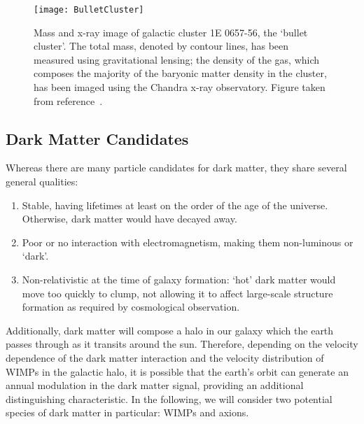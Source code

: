 			\begin{figure}
				\centering
				\texttt{[image: BulletCluster]}
				\caption[Mass and x-ray image of the `bullet cluster', galactic cluster 1E 0657-56.]{Mass and x-ray image of 
				galactic cluster 1E 0657-56, 
				the `bullet cluster'.   The total mass, denoted by contour lines, has been measured using gravitational lensing; 
				the density of the gas, which composes the majority of the baryonic matter density in the cluster, has been 
				imaged using the Chandra x-ray observatory.  %
				Figure taken from reference~\cite{Clowe06}.}
				\label{fig:DMBulletCluster}
			\end{figure}	
	
		\subsection{Dark Matter Candidates}
	
	Whereas there are many particle candidates for dark matter, they share several general qualities:

	
	
			\begin{enumerate}	
				\item Stable, having lifetimes at least on the order of the age of the universe.  Otherwise, dark matter would have
				decayed away.  
				\item Poor or no interaction with electromagnetism, making them non-luminous or `dark'.
				\item Non-relativistic at the time of galaxy formation: `hot' dark matter would move too quickly to clump, 
				not allowing it to affect large-scale structure formation as required by cosmological observation.  
			\end{enumerate}		

Additionally, dark matter will compose a halo in our galaxy which the earth passes through as it transits around the sun.  Therefore, depending on the velocity dependence of the dark matter interaction and the velocity distribution of WIMPs in the galactic halo, it is possible that the earth's orbit can generate an annual modulation in the dark matter signal, providing an additional distinguishing characteristic.  In the following, we will consider two potential species of dark matter in particular: WIMPs and axions. 
